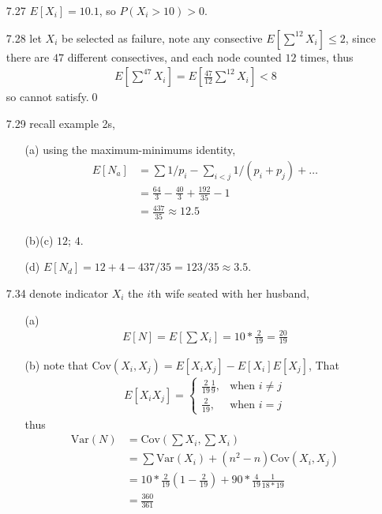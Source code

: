 \documentclass[paper=a4, fontsize=11pt]{scrartcl} %
\numberwithin{equation}{section} %
\numberwithin{figure}{section} %
\numberwithin{table}{section} %
\def \cov {\text{Cov}}
\def \var {\text{Var}}
\begin{document}
\begin{itemize}
	\item[7.27] $E[X_i]=10.1$, so $P(X_i>10)>0$.	
	\item[7.28] let $X_i$ be selected as failure, note any consective $E[\sum^{12} X_i]\leq 2$, since there are $47$ different consectives, and each node counted $12$ times, thus
	\begin{align}
		E[\sum^{47} X_i] = E[\frac{47}{12} \sum^{12} X_i] < 8
	\end{align}
	so cannot satisfy.\qed
	\item[7.29] recall example 2s,
	\begin{itemize}
		\item[(a)] using the maximum-minimums identity,
		\begin{align}
			E[N_a] &= \sum 1/p_i - \sum_{i<j} 1/(p_i+p_j)+\dots \\
				&= \frac{64}{3} - \frac{40}{3} + \frac{192}{35} - 1 \\
				&= \frac{437}{35}\approx 12.5
		\end{align}
		\item[(b)(c)] $12$; $4$.
		\item[(d)] $E[N_d]= 12+4 - 437/35 = 123/35\approx 3.5$.
	\end{itemize}
	\item[7.34] denote indicator $X_i$ the $i$th wife seated with her husband,
	\begin{itemize}
		\item[(a)]
		\begin{align}
			E[N] = E[\sum X_i] = 10 * \frac{2}{19} = \frac{20}{19}
		\end{align}
		\item[(b)] note that $\cov(X_i,X_j) = E[X_iX_j] - E[X_i]E[X_j]$, That
		\begin{align}
			E[X_iX_j] = \begin{cases} \frac{2}{19}\frac{1}{9}, &\mbox{when $i\neq j$} \\  \frac{2}{19}, &\mbox{when $i=j$}\end{cases}
		\end{align}
		thus
		\begin{align}
			\var(N) &= \cov(\sum X_i, \sum X_i)\\
				&= \sum \var(X_i) + (n^2-n)\cov(X_i,X_j)\\
				&= 10 * \frac{2}{19}(1-\frac{2}{19}) + 90 * \frac{4}{19}\frac{1}{18*19}\\
				&= \frac{360}{361}
		\end{align}
	\end{itemize}

\end{itemize}
\end{document}
